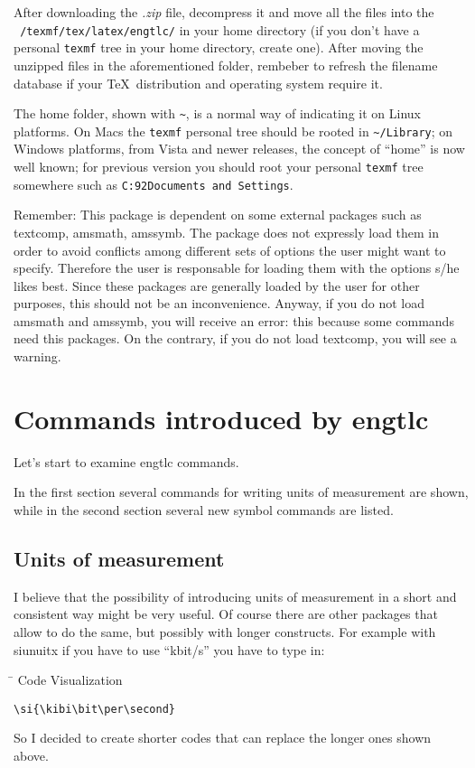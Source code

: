 \documentclass[11pt,a4paper,openany]{book}
\newcommand*{\meta}[1]{{\normalfont\textlangle\textit{#1}\textrangle}}
\begin{document}
After downloading the \emph{.zip} file, decompress it and move all the files into the \texttt{~/texmf/tex/latex/engtlc/} in your home directory (if you don't have a personal \texttt{texmf} tree in your home directory, create one). After moving the unzipped files in the aforementioned folder, rembeber to refresh the filename database if your \TeX\ distribution and operating system require it.

The home folder, shown with \texttt{\textasciitilde}, is a normal way of indicating it on Linux platforms. On Macs the \texttt{texmf} personal tree should be rooted in \texttt{\textasciitilde/Library}; on Windows platforms, from Vista and newer releases, the concept of ``home'' is now well known; for previous version you should root your personal \texttt{texmf} tree somewhere such as \texttt{C:\char92Documents and Settings\char92\meta{your username}}.

Remember: This package is dependent on some external packages such as \textsf{textcomp}, \textsf{amsmath}, \textsf{amssymb}. The package does not expressly load them in order to avoid conflicts among different sets of options the user might want to specify. Therefore the user is responsable for loading them with the options s/he likes best. Since these packages are generally loaded by the user for other purposes, this should not be an inconvenience. Anyway, if you do not load 
\textsf{amsmath} and \textsf{amssymb}, you will receive an error: this because some commands need this packages. On the contrary, if you do not load \textsf{textcomp}, you will see a warning.


\chapter{Commands introduced by \textsf{engtlc}}\label{chap:comandi}
Let's start to examine \textsf{engtlc} commands.

In the first section several commands for writing units of measurement are shown, while in the second section several new symbol commands are listed.

\section{Units of measurement}
I believe that the possibility of introducing units of measurement in a short and consistent way might be very useful. Of course there are other packages that allow to do the same, but possibly with longer constructs. For example with siunuitx  if you have to use ``kbit/s'' you have to type in:
\begin{tabbing}
\hspace{7cm}\= \kill
Code \> Visualization \\ 
\begin{lstlisting}
\si{\kibi\bit\per\second}
\end{lstlisting}  \> \kbits
\end{tabbing} 
So I decided to create shorter codes that can replace the longer ones shown above.
\end{document}
